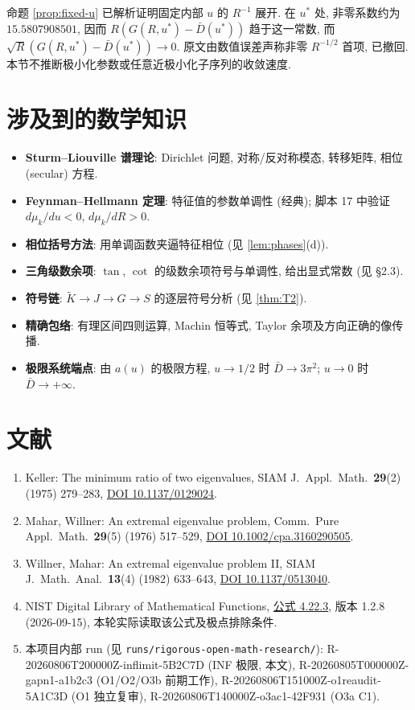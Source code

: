\documentclass[UTF8]{ctexart}
\begin{document}
命题 \ref{prop:fixed-u} 已解析证明固定内部 $u$ 的 $R^{-1}$ 展开.
在 $u^*$ 处, 非零系数约为 $15.5807908501$, 因而
$R(G(R,u^*)-\bar D(u^*))$ 趋于这一常数,
而 $\sqrt R(G(R,u^*)-\bar D(u^*))\to0$.
原文由数值误差声称非零 $R^{-1/2}$ 首项, 已撤回.
本节不推断极小化参数或任意近极小化子序列的收敛速度.

\section{涉及到的数学知识}
\begin{itemize}
	\item \textbf{Sturm--Liouville 谱理论}: Dirichlet 问题, 对称/反对称模态,
		转移矩阵, 相位 (secular) 方程.
	\item \textbf{Feynman--Hellmann 定理}: 特征值的参数单调性 (经典);
		脚本 17 中验证 $d\mu_k/du<0$, $d\mu_k/dR>0$.
	\item \textbf{相位括号方法}: 用单调函数夹逼特征相位 (见 \ref{lem:phases}(d)).
	\item \textbf{三角级数余项}: $\tan$, $\cot$ 的级数余项符号与单调性,
		给出显式常数 (见 §2.3).
	\item \textbf{符号链}: $\widetilde K\to J\to G\to S$ 的逐层符号分析
		(见 \ref{thm:T2}).
	\item \textbf{精确包络}: 有理区间四则运算, Machin 恒等式, Taylor 余项及方向正确的像传播.
	\item \textbf{极限系统端点}: 由 $a(u)$ 的极限方程, $u\to1/2$ 时 $\bar D\to3\pi^2$;
		$u\to0$ 时 $\bar D\to+\infty$.
\end{itemize}

\section{文献}
\sloppy
\begin{enumerate}
\raggedright
	\item Keller: The minimum ratio of two eigenvalues, SIAM J.\ Appl.\ Math.\
		\textbf{29}(2) (1975) 279--283,
		\href{https://doi.org/10.1137/0129024}{DOI 10.1137/0129024}.
	\item Mahar, Willner: An extremal eigenvalue problem, Comm.\ Pure Appl.\ Math.\
		\textbf{29}(5) (1976) 517--529,
		\href{https://doi.org/10.1002/cpa.3160290505}{DOI 10.1002/cpa.3160290505}.
	\item Willner, Mahar: An extremal eigenvalue problem II, SIAM J.\ Math.\ Anal.\
		\textbf{13}(4) (1982) 633--643,
		\href{https://doi.org/10.1137/0513040}{DOI 10.1137/0513040}.
	\item NIST Digital Library of Mathematical Functions, \href{https://dlmf.nist.gov/4.22.E3}{公式 4.22.3},
版本 1.2.8 (2026-09-15), 本轮实际读取该公式及极点排除条件.
\item 本项目内部 run (见 \texttt{runs/rigorous-open-math-research/}):
		R-20260806T200000Z-inflimit-5B2C7D (INF 极限, 本文),
		R-20260805T000000Z-gapn1-a1b2c3 (O1/O2/O3b 前期工作),
		R-20260806T151000Z-o1reaudit-5A1C3D (O1 独立复审),
		R-20260806T140000Z-o3ac1-42F931 (O3a C1).
\end{enumerate}
\end{document}
